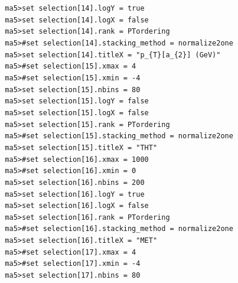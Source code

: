 \documentclass[a4paper, 10pt]{article}
\begin{document}
\texttt{ }\texttt{ }\texttt{ma5>set selection[14].logY = true\\
}
\texttt{ }\texttt{ }\texttt{ma5>set selection[14].logX = false\\
}
\texttt{ }\texttt{ }\texttt{ma5>set selection[14].rank = PTordering\\
}
\texttt{ }\texttt{ }\texttt{ma5>\#set selection[14].stacking\_method = normalize2one\\
}
\texttt{ }\texttt{ }\texttt{ma5>set selection[14].titleX = "p\_\{T\}[a\_\{2\}] (GeV)"\\
}
\texttt{ }\texttt{ }\texttt{ma5>\#set selection[15].xmax = 4\\
}
\texttt{ }\texttt{ }\texttt{ma5>\#set selection[15].xmin = -4\\
}
\texttt{ }\texttt{ }\texttt{ma5>set selection[15].nbins = 80\\
}
\texttt{ }\texttt{ }\texttt{ma5>set selection[15].logY = false\\
}
\texttt{ }\texttt{ }\texttt{ma5>set selection[15].logX = false\\
}
\texttt{ }\texttt{ }\texttt{ma5>set selection[15].rank = PTordering\\
}
\texttt{ }\texttt{ }\texttt{ma5>\#set selection[15].stacking\_method = normalize2one\\
}
\texttt{ }\texttt{ }\texttt{ma5>set selection[15].titleX = "THT"\\
}
\texttt{ }\texttt{ }\texttt{ma5>\#set selection[16].xmax = 1000\\
}
\texttt{ }\texttt{ }\texttt{ma5>\#set selection[16].xmin = 0\\
}
\texttt{ }\texttt{ }\texttt{ma5>set selection[16].nbins = 200\\
}
\texttt{ }\texttt{ }\texttt{ma5>set selection[16].logY = true\\
}
\texttt{ }\texttt{ }\texttt{ma5>set selection[16].logX = false\\
}
\texttt{ }\texttt{ }\texttt{ma5>set selection[16].rank = PTordering\\
}
\texttt{ }\texttt{ }\texttt{ma5>\#set selection[16].stacking\_method = normalize2one\\
}
\texttt{ }\texttt{ }\texttt{ma5>set selection[16].titleX = "MET"\\
}
\texttt{ }\texttt{ }\texttt{ma5>\#set selection[17].xmax = 4\\
}
\texttt{ }\texttt{ }\texttt{ma5>\#set selection[17].xmin = -4\\
}
\texttt{ }\texttt{ }\texttt{ma5>set selection[17].nbins = 80\\
}
\end{document}

